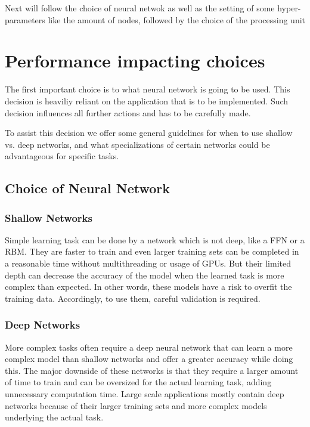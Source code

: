 \documentclass[conference]{IEEEtran}
\begin{document}





Next will follow the choice of neural netwok as well as the setting of some hyper-parameters like the amount of nodes, followed by the choice of the processing unit



\section{Performance impacting choices}	

The first important choice is to what neural network is going to be used. This decision is heaviliy reliant on the application that is to be implemented. Such decision influences all further actions and has to be carefully made.

To assist this decision we offer some general guidelines for when to use shallow vs. deep networks, and what specializations of certain networks could be advantageous for specific tasks.

\subsection{Choice of Neural Network}
\subsubsection{Shallow Networks}
Simple learning task can be done by a network which is not deep, like a FFN or a RBM. They are faster to train and even larger training sets can be completed in a reasonable time without multithreading or usage of GPUs. But their limited depth can decrease the accuracy of the model when the learned task is more complex than expected. In other words, these models have a risk to overfit the training data. Accordingly, to use them, careful validation is required. 

\subsubsection{Deep Networks}
More complex tasks often require a deep neural network that can learn a more complex model than shallow networks and offer a greater accuracy while doing this. The major downside of these networks is that they require a larger amount of time to train and can be oversized for the actual learning task, adding unnecessary computation time. Large scale applications mostly contain deep networks because of their larger training sets and more complex models underlying the actual task.
\end{document}
